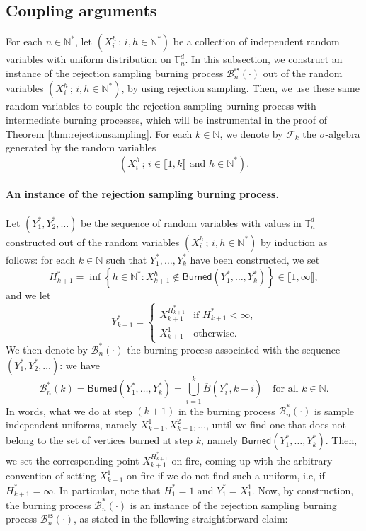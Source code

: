 \documentclass[a4paper,11pt]{article}
\begin{document}
\subsection{Coupling arguments}\label{subsec:coupling}

For each $n\in\mathbb{N}^*$, let $\left(X_i^h\,;\,i,h\in\mathbb{N}^*\right)$ be a collection of independent random variables with uniform distribution on $\mathbb{T}_n^d$.
In this subsection, we construct an instance of the rejection sampling burning process $\mathcal{B}_n^\mathsf{rs}(\cdot)$ out of the random variables $\left(X_i^h\,;\,i,h\in\mathbb{N}^*\right)$, by using rejection sampling.
Then, we use these same random variables to couple the rejection sampling burning process with intermediate burning processes, which will be instrumental in the proof of Theorem \ref{thm:rejectionsampling}.
For each $k\in\mathbb{N}$, we denote by $\mathcal{F}_k$ the $\sigma$-algebra generated by the random variables
\[\left(X_i^h\,;\,\text{$i\in\llbracket1,k\rrbracket$ and $h\in\mathbb{N}^*$}\right).\]

\paragraph{An instance of the rejection sampling burning process.}

Let $\left(Y_1^*,Y_2^*,\ldots\right)$ be the sequence of random variables with values in $\mathbb{T}_n^d$ constructed out of the random variables $\left(X_i^h\,;\,i,h\in\mathbb{N}^*\right)$ by induction as follows: for each $k\in\mathbb{N}$ such that $Y_1^*,\ldots,Y_k^*$ have been constructed, we set
\[H_{k+1}^*=\inf\left\{h\in\mathbb{N}^*:X_{k+1}^h\notin\mathsf{Burned}\left(Y_1^*,\ldots,Y_k^*\right)\right\}\in\llbracket1,\infty\rrbracket,\]
and we let
\[Y_{k+1}^*=\begin{cases}
X_{k+1}^{H_{k+1}^*}&\text{if $H_{k+1}^*<\infty$,}\\
X_{k+1}^1&\text{otherwise.}
\end{cases}\]
We then denote by $\mathcal{B}_n^*(\cdot)$ the burning process associated with the sequence $\left(Y_1^*,Y_2^*,\ldots\right)$: we have
\[\mathcal{B}_n^*(k)=\mathsf{Burned}(Y_1^*,\ldots,Y_k^*)=\bigcup_{i=1}^k\overline{B}\left(Y_i^*,k-i\right)\quad\text{for all $k\in\mathbb{N}$.}\]
In words, what we do at step $(k+1)$ in the burning process $\mathcal{B}_n^*(\cdot)$ is sample independent uniforms, namely $X_{k+1}^1,X_{k+1}^2,\ldots$, until we find one that does not belong to the set of vertices burned at step $k$, namely $\mathsf{Burned}(Y_1^*,\ldots,Y_k^*)$.
Then, we set the corresponding point $X_{k+1}^{H_{k+1}^*}$ on fire, coming up with the arbitrary convention of setting $X_{k+1}^1$ on fire if we do not find such a uniform, i.e, if $H_{k+1}^*=\infty$.
In particular, note that $H_1^*=1$ and $Y_1^*=X_1^1$.
Now, by construction, the burning process $\mathcal{B}_n^*(\cdot)$ is an instance of the rejection sampling burning process $\mathcal{B}_n^\mathsf{rs}(\cdot)$, as stated in the following straightforward claim:
\end{document}
